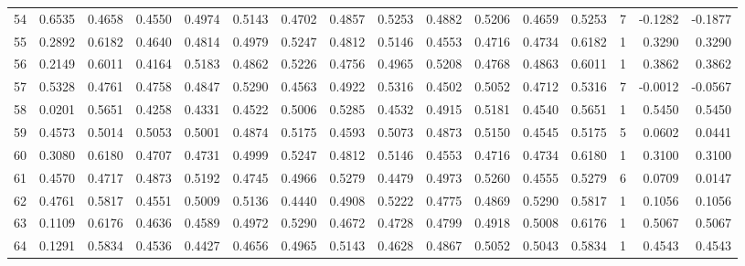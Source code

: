 \begin{tabular}{lrrrrrrrrrrrrrrr}
54  &      0.6535 &  0.4658 &  0.4550 &  0.4974 &  0.5143 &  0.4702 &  0.4857 &  0.5253 &  0.4882 &  0.5206 &   0.4659 &     0.5253 &      7 &                   -0.1282 &                    -0.1877 \\
55  &      0.2892 &  0.6182 &  0.4640 &  0.4814 &  0.4979 &  0.5247 &  0.4812 &  0.5146 &  0.4553 &  0.4716 &   0.4734 &     0.6182 &      1 &                    0.3290 &                     0.3290 \\
56  &      0.2149 &  0.6011 &  0.4164 &  0.5183 &  0.4862 &  0.5226 &  0.4756 &  0.4965 &  0.5208 &  0.4768 &   0.4863 &     0.6011 &      1 &                    0.3862 &                     0.3862 \\
57  &      0.5328 &  0.4761 &  0.4758 &  0.4847 &  0.5290 &  0.4563 &  0.4922 &  0.5316 &  0.4502 &  0.5052 &   0.4712 &     0.5316 &      7 &                   -0.0012 &                    -0.0567 \\
58  &      0.0201 &  0.5651 &  0.4258 &  0.4331 &  0.4522 &  0.5006 &  0.5285 &  0.4532 &  0.4915 &  0.5181 &   0.4540 &     0.5651 &      1 &                    0.5450 &                     0.5450 \\
59  &      0.4573 &  0.5014 &  0.5053 &  0.5001 &  0.4874 &  0.5175 &  0.4593 &  0.5073 &  0.4873 &  0.5150 &   0.4545 &     0.5175 &      5 &                    0.0602 &                     0.0441 \\
60  &      0.3080 &  0.6180 &  0.4707 &  0.4731 &  0.4999 &  0.5247 &  0.4812 &  0.5146 &  0.4553 &  0.4716 &   0.4734 &     0.6180 &      1 &                    0.3100 &                     0.3100 \\
61  &      0.4570 &  0.4717 &  0.4873 &  0.5192 &  0.4745 &  0.4966 &  0.5279 &  0.4479 &  0.4973 &  0.5260 &   0.4555 &     0.5279 &      6 &                    0.0709 &                     0.0147 \\
62  &      0.4761 &  0.5817 &  0.4551 &  0.5009 &  0.5136 &  0.4440 &  0.4908 &  0.5222 &  0.4775 &  0.4869 &   0.5290 &     0.5817 &      1 &                    0.1056 &                     0.1056 \\
63  &      0.1109 &  0.6176 &  0.4636 &  0.4589 &  0.4972 &  0.5290 &  0.4672 &  0.4728 &  0.4799 &  0.4918 &   0.5008 &     0.6176 &      1 &                    0.5067 &                     0.5067 \\
64  &      0.1291 &  0.5834 &  0.4536 &  0.4427 &  0.4656 &  0.4965 &  0.5143 &  0.4628 &  0.4867 &  0.5052 &   0.5043 &     0.5834 &      1 &                    0.4543 &                     0.4543 \\

\end{tabular}
